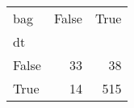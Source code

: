 \begin{tabular}{lrr}
\toprule
bag &  False &  True  \\
dt    &        &        \\
\midrule
False &     33 &     38 \\
True  &     14 &    515 \\
\bottomrule
\end{tabular}
